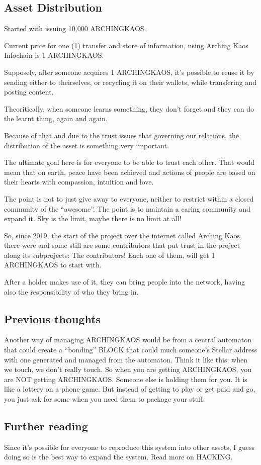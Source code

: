 \hypertarget{asset-distribution}{%
\subsection{Asset Distribution}\label{asset-distribution}}

Started with issuing 10,000 ARCHINGKAOS.

Current price for one (1) transfer and store of information, using
Arching Kaos Infochain is 1 ARCHINGKAOS.

Supposely, after someone acquires 1 ARCHINGKAOS, it's possible to reuse
it by sending either to theirselves, or recycling it on their wallets,
while transfering and posting content.

Theoritically, when someone learns something, they don't forget and they
can do the learnt thing, again and again.

Because of that and due to the trust issues that governing our
relations, the distribution of the asset is something very important.

The ultimate goal here is for everyone to be able to trust each other.
That would mean that on earth, peace have been achieved and actions of
people are based on their hearts with compassion, intuition and love.

The point is not to just give away to everyone, neither to restrict
within a closed community of the ``awesome''. The point is to maintain a
caring community and expand it. Sky is the limit, maybe there is no
limit at all!

So, since 2019, the start of the project over the internet called
Arching Kaos, there were and some still are some contributors that put
trust in the project along its subprojects: The contributors! Each one
of them, will get 1 ARCHINGKAOS to start with.

After a holder makes use of it, they can bring people into the network,
having also the responsibility of who they bring in.

\hypertarget{previous-thoughts}{%
\subsection{Previous thoughts}\label{previous-thoughts}}

Another way of managing ARCHINGKAOS would be from a central automaton
that could create a ``bonding'' BLOCK that could much someone's Stellar
address with one generated and managed from the automaton. Think it like
this: when we touch, we don't really touch. So when you are getting
ARCHINGKAOS, you are NOT getting ARCHINGKAOS. Someone else is holding
them for you. It is like a lottery on a phone game. But instead of
getting to play or get paid and go, you just ask for some when you need
them to package your stuff.

\hypertarget{further-reading}{%
\subsection{Further reading}\label{further-reading}}

Since it's possible for everyone to reproduce this system into other
assets, I guess doing so is the best way to expand the system. Read more
on HACKING.
